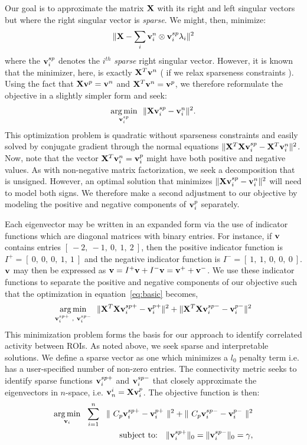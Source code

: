 \documentclass{llncs}
\newcommand{\X}{{\bf X}}
\newcommand{\vv}{{\bf v}}
\begin{document}
Our goal is to approximate the matrix $\X$ with its right and left singular vectors but where the right singular vector is {\em sparse}.  We might, then, minimize:
\begin{eqnarray}
\label{eq:recon}
\| \X  -  \sum_i \vv^n_i \otimes \vv^{sp}_i \lambda_i  \|^2
\end{eqnarray}
where the $\vv^{sp}_i$ denotes the $i^{th}$ {\em sparse} right singular vector.  However, it is known that the minimizer, here, is exactly $\X^T \vv^n$ ( if we relax sparseness constraints ).  Using the fact that $\X \vv^p = \vv^n$ and $\X^T \vv^n = \vv^p$,  we therefore reformulate the objective in a slightly simpler form and seek:
\begin{eqnarray}
\label{eq:basic}
\underset{\vv^{sp}_i}{\operatorname{arg\,min}}~~\|  \X \vv^{sp}_i - \vv_i^n \|^2 . 
\end{eqnarray}
This optimization problem is quadratic without sparseness constraints and easily solved by conjugate gradient through the normal equations $\| \X^T\X \vv^{sp}_i - \X^T\vv_i^n \|^2$. Now, note that the vector $\X^T\vv_i^n=\vv_i^p$ might have both positive and negative values.  As with non-negative matrix factorization, we seek a decomposition that is unsigned.   However, an optimal solution that minimizes $\|  \X \vv^{sp}_i - \vv_i^n \|^2$ will need to model both signs.  We therefore make a second adjustment to our objective by modeling the positive and negative components of $\vv_i^p$ separately.

Each eigenvector may be written in an expanded form via the use of indicator functions which are diagonal matrices with binary entries.  For instance, if $\vv$ contains entries $[~-2,~-1,~0,~1,~2~]$, then the positive indicator function is $I^+=[~0,~0,~0,~1,~1~]$ and the negative indicator function is $I^-=[~1,~1,~0,~0,~0~]$.  $\vv$ may then be expressed as $\vv = I^+\vv + I^- \vv = \vv^+ + \vv^-$.  We use these indicator functions to separate the positive and negative components of our objective such that the optimization in equation~\ref{eq:basic} becomes,
\begin{equation}
\label{eq:basic2}
\underset{\vv^{sp+}_i~,~\vv^{sp-}_i}{\operatorname{arg\,min}}~~\|  \X^T\X \vv^{sp+}_i - \vv_i^{p+} \|^2 + \|  \X^T\X \vv^{sp-}_i - \vv_i^{p-} \|^2  
\end{equation}
This minimization problem forms the basis for our approach to identify correlated activity between ROIs. As noted above, we seek sparse and interpretable solutions.  We define a sparse vector as one which minimizes a $l_0$ penalty term i.e. has a user-specified number of non-zero entries. The connectivity metric seeks to identify sparse functions $\vv_i^{sp+}$ and $\vv_i^{sp-}$ that closely approximate the eigenvectors in $n$-space, i.e. $\vv^i_n=\X \vv_i^p$.  The objective function is then:
\begin{eqnarray}
\label{eq:eigenanatomy}
\underset{\vv_i}{\operatorname{arg\,min}}~~\sum^n_{i=1}~~\|~C_p \vv_i^{sp+} - \vv_i^{p+} ~\|^2 + \|~C_p \vv_i^{sp-} - \vv_i^{p-} ~\|^2 \\ 
\text{subject to:}~~~  \| \vv_i^{sp+} \|_0 =  \| \vv_i^{sp-} \|_0 = \gamma,\notag
\end{eqnarray}
\end{document}
